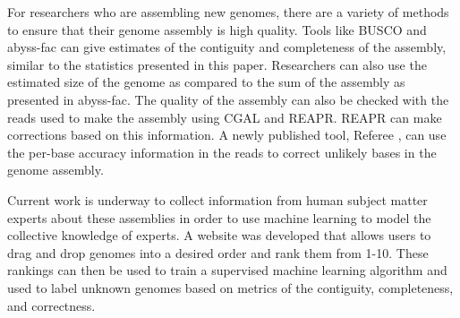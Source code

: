 \documentclass[twocolumn, dvipsnames]{bmcart}%
\begin{document}
For researchers who are assembling new genomes, there are a variety of methods to ensure that their genome assembly is high quality. Tools like BUSCO and abyss-fac can give estimates of the contiguity and completeness of the assembly, similar to the statistics presented in this paper. Researchers can also use the estimated size of the genome as compared to the sum of the assembly as presented in abyss-fac. The quality of the assembly can also be checked with the reads used to make the assembly using CGAL and REAPR. REAPR can make corrections based on this information. A newly published tool, Referee \cite{thomas_referee:_2019}, can use the per-base accuracy information in the reads to correct unlikely bases in the genome assembly.

Current work is underway to collect information from human subject matter experts about these assemblies in order to use machine learning to model the collective knowledge of experts. A website was developed that allows users to drag and drop genomes into a desired order and rank them from 1-10. These rankings can then be used to train a supervised machine learning algorithm and used to label unknown genomes based on metrics of the contiguity, completeness, and correctness.

\end{document}
